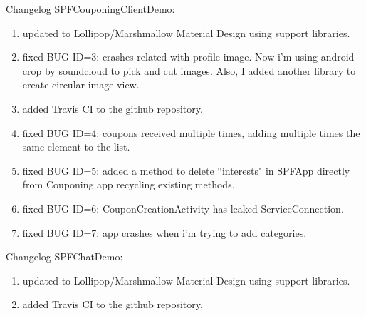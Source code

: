Changelog SPFCouponingClientDemo:
\begin{enumerate}
	\item updated to Lollipop/Marshmallow Material Design using support libraries.
	\item fixed BUG ID=3: crashes related with profile image. Now i'm using android-crop by soundcloud to pick and cut images. Also, I added another library to create circular image view.	
	\item added Travis CI to the github repository.
	\item fixed BUG ID=4: coupons received multiple times, adding multiple times the same element to the list.
	\item fixed BUG ID=5: added a method to delete ``interests" in SPFApp directly from Couponing app recycling existing methods.
	\item fixed BUG ID=6: CouponCreationActivity has leaked ServiceConnection.
	\item fixed BUG ID=7: app crashes when i'm trying to add categories.
\end{enumerate}

Changelog SPFChatDemo:
\begin{enumerate}
	\item updated to Lollipop/Marshmallow Material Design using support libraries.	
	\item added Travis CI to the github repository.
\end{enumerate}
